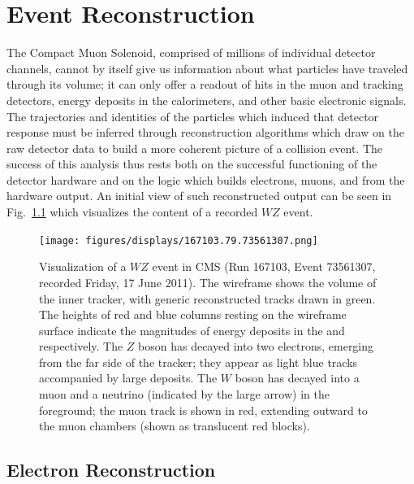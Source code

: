 \chapter{Event Reconstruction}
\label{chapter:reconstruction}

The Compact Muon Solenoid, comprised of millions of individual detector channels, cannot by itself give us information about what particles have traveled through its volume; it can only offer a readout of hits in the muon and tracking detectors, energy deposits in the calorimeters, and other basic electronic signals.  The trajectories and identities of the particles which induced that detector response must be inferred through reconstruction algorithms which draw on the raw detector data to build a more coherent picture of a collision event.  The success of this analysis thus rests both on the successful functioning of the detector hardware and on the logic which builds electrons, muons, and \MET from the hardware output.  An initial view of such reconstructed output can be seen in Fig.~\ref{fig:visualization} which visualizes the content of a recorded $WZ$ event.

\begin{figure}
  \centering
  \texttt{[image: figures/displays/167103.79.73561307.png]}
  \caption[Visualization of a $WZ$ event in CMS]{Visualization of a $WZ$ event in CMS (Run 167103, Event 73561307, recorded Friday, 17 June 2011).  The wireframe shows the volume of the inner tracker, with generic reconstructed tracks drawn in green.  The heights of red and blue columns resting on the wireframe surface indicate the magnitudes of energy deposits in the \ecal and \hcal respectively.  The $Z$ boson has decayed into two electrons, emerging from the far side of the tracker; they appear as light blue tracks accompanied by large \ecal deposits.  The $W$ boson has decayed into a muon and a neutrino (indicated by the large \MET arrow) in the foreground; the muon track is shown in red, extending outward to the muon chambers (shown as translucent red blocks).}
  \label{fig:visualization}
\end{figure}


\section{Electron Reconstruction}

